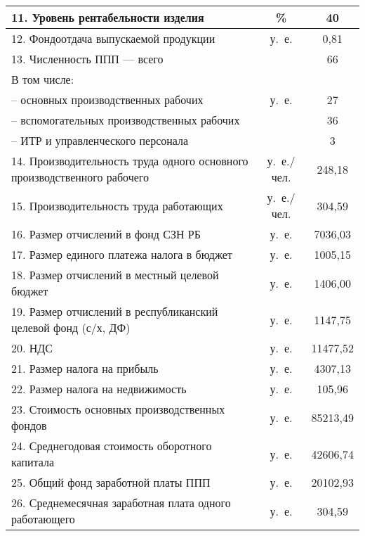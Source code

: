 {\begin{longtable}{| m{10.2cm} | c | c |}
      11. Уровень рентабельности изделия & \% & 40 \\
      \hline

      12. Фондоотдача выпускаемой продукции & у.~е. & 0{,}81 \\
      \hline

      13. Численность ППП --- всего & \multirow{5}{*}{у.~е.} & 66 \\
      В том числе: & & \\
      -- основных производственных рабочих & & 27 \\
      -- вспомогательных производственных рабочих & & 36 \\ \hline
      -- ИТР и управленческого персонала & & 3 \\ 
      \hline

      14. Производительность труда одного \newline 
      основного производственного рабочего 
      & у.~е./чел. & 248{,}18 \\
      \hline

      15. Производительность труда работающих
      & у.~е./чел. & 304{,}59 \\
      \hline

      16. Размер отчислений в фонд СЗН РБ
      & у.~е. & 7036{,}03 \\
      \hline

      17. Размер единого платежа налога в бюджет
      & у.~е. & 1005{,}15 \\
      \hline

      18. Размер отчислений в местный целевой бюджет
      & у.~е. & 1406{,}00 \\
      \hline

      19. Размер отчислений в республиканский целевой фонд \newline (с/х, ДФ)
      & у.~е. & 1147{,}75 \\
      \hline

      20. НДС
      & у.~е. & 11477{,}52 \\
      \hline

      21. Размер налога на прибыль
      & у.~е. & 4307{,}13 \\
      \hline

      22. Размер налога на недвижимость
      & у.~е. & 105{,}96 \\
      \hline

      23. Стоимость основных производственных фондов
      & у.~е. & 85213{,}49 \\
      \hline

      24. Среднегодовая стоимость оборотного капитала
      & у.~е. & 42606{,}74 \\
      \hline

      25. Общий фонд заработной платы ППП
      & у.~е. & 20102{,}93 \\
      \hline

      26. Среднемесячная заработная плата одного \newline работающего
      & у.~е. & 304{,}59 \\
      \hline
\end{longtable}
}
